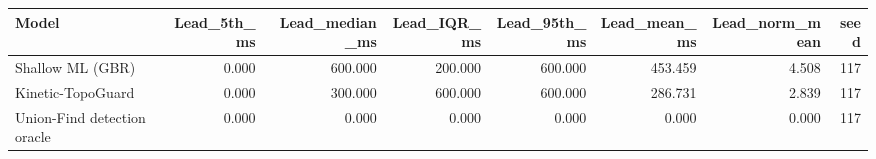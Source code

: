 \begin{tabular}{lrrrrrrr}
\toprule
Model & Lead\_5th\_ms & Lead\_median\_ms & Lead\_IQR\_ms & Lead\_95th\_ms & Lead\_mean\_ms & Lead\_norm\_mean & seed \\
\midrule
Shallow ML (GBR) & 0.000 & 600.000 & 200.000 & 600.000 & 453.459 & 4.508 & 117 \\
Kinetic-TopoGuard & 0.000 & 300.000 & 600.000 & 600.000 & 286.731 & 2.839 & 117 \\
Union-Find detection oracle & 0.000 & 0.000 & 0.000 & 0.000 & 0.000 & 0.000 & 117 \\
\bottomrule
\end{tabular}